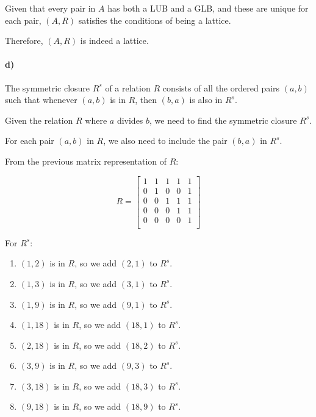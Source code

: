 \documentclass[12pt]{article}
\begin{document}
Given that every pair in \( A \) has both a LUB and a GLB, and these are unique for each pair, \( (A, R) \) satisfies the conditions of being a lattice.

Therefore, \( (A, R) \) is indeed a lattice.\\

\paragraph{d)}

The symmetric closure \( R^s \) of a relation \( R \) consists of all the ordered pairs \( (a, b) \) such that whenever \( (a, b) \) is in \( R \), then \( (b, a) \) is also in \( R^s \).

Given the relation \( R \) where \( a \) divides \( b \), we need to find the symmetric closure \( R^s \).

For each pair \( (a, b) \) in \( R \), we also need to include the pair \( (b, a) \) in \( R^s \).

From the previous matrix representation of \( R \):

\[
R = \begin{bmatrix}
1 & 1 & 1 & 1 & 1 \\
0 & 1 & 0 & 0 & 1 \\
0 & 0 & 1 & 1 & 1 \\
0 & 0 & 0 & 1 & 1 \\
0 & 0 & 0 & 0 & 1 \\
\end{bmatrix}
\]

For \( R^s \):

\begin{enumerate}
    \item \( (1, 2) \) is in \( R \), so we add \( (2, 1) \) to \( R^s \).
    \item \( (1, 3) \) is in \( R \), so we add \( (3, 1) \) to \( R^s \).
    \item \( (1, 9) \) is in \( R \), so we add \( (9, 1) \) to \( R^s \).
    \item \( (1, 18) \) is in \( R \), so we add \( (18, 1) \) to \( R^s \).
    \item \( (2, 18) \) is in \( R \), so we add \( (18, 2) \) to \( R^s \).
    \item \( (3, 9) \) is in \( R \), so we add \( (9, 3) \) to \( R^s \).
    \item \( (3, 18) \) is in \( R \), so we add \( (18, 3) \) to \( R^s \).
    \item \( (9, 18) \) is in \( R \), so we add \( (18, 9) \) to \( R^s \).
\end{enumerate}
\end{document}
